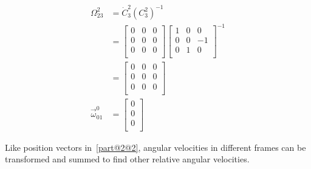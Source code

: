 \begin{parts}
\begin{subparts}
        \solution
        \begin{equation*}
            \begin{split}
                {\Omega}^2_{23} & = \dot{C}^2_3(C^2_3)^{-1}\\
                & =
                \begin{bmatrix}
                    0 & 0 & 0 \\
                    0 & 0 & 0 \\
                    0 & 0 & 0 \\
                \end{bmatrix}
                \begin{bmatrix}
                    1 & 0 & 0  \\
                    0 & 0 & -1 \\
                    0 & 1 & 0  \\
                \end{bmatrix}^{-1} \\
                & =
                \begin{bmatrix}
                    0 & 0 & 0 \\
                    0 & 0 & 0 \\
                    0 & 0 & 0 \\
                \end{bmatrix} \\
                \vec{\omega}^0_{01} & =
                \begin{bmatrix}
                    0 \\
                    0 \\
                    0 \\
                \end{bmatrix}
            \end{split}
        \end{equation*}


        \solution
        Like position vectors in~\ref*{part@2@2}, angular velocities in different frames can be transformed and summed to find other relative angular velocities.


\end{subparts}
\end{parts}
